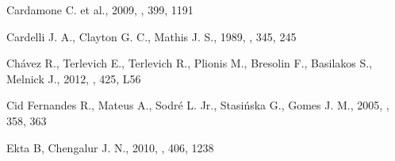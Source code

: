 \begin{thebibliography}{}








 Cardamone C. et al.,
2009, \mnras, 399, 1191

Cardelli J. A., Clayton G. C., Mathis J. S., 1989, \apj, 345, 245

 Ch\'avez R., Terlevich E., Terlevich R.,
Plionis M., Bresolin F., Basilakos S., Melnick J., 2012, \mnras, 425, L56

 Cid Fernandes R., Mateus A.,
Sodr\'e L. Jr., Stasi\'nska G., Gomes J. M., 2005, \mnras, 358, 363

 Ekta B, Chengalur J. N., 2010,
\mnras, 406, 1238






\end{thebibliography}
